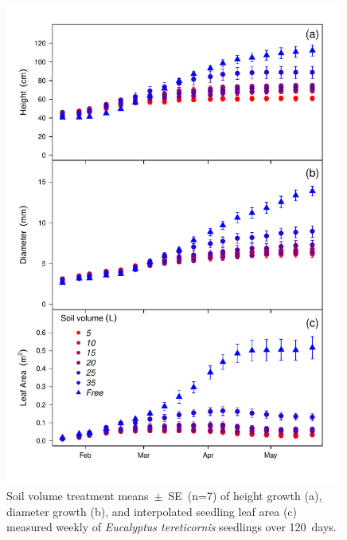 \documentclass[a4paper]{article}\usepackage[]{graphicx}\usepackage[]{color}
\begin{document}
\begin{figure}[h!]
    \centering
    \includegraphics[width=0.99\textwidth]{allometry.pdf}
    \caption{Soil volume treatment means~$\pm$~SE~(n=7) of height growth (a), diameter growth (b), and interpolated seedling leaf area (c) measured weekly of \textit{Eucalyptus tereticornis} seedlings over 120~days.}
    \label{fig:figure2}
\end{figure}
\end{document}
